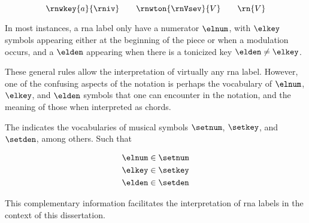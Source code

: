 \begin{equation}
    \label{eq:rn_three_annotations}
    \rnwkey{a}{\rniv} \qquad \rnwton{\rnVsev}{V} \qquad \rn{V}
\end{equation}


In most instances, a \gls{rna} label only have a numerator
$\elnum$, with $\elkey$ symbols appearing either at the
beginning of the piece or when a modulation occurs, and a
$\elden$ appearing when there is a tonicized key $\elden
\neq \elkey$.

These general rules allow the interpretation of virtually
any \gls{rna} label. However, one of the confusing aspects
of the notation is perhaps the vocabulary of $\elnum$,
$\elkey$, and $\elden$ symbols that one can encounter in the
notation, and the meaning of those when interpreted as
chords.

The 
indicates the vocabularies of musical symbols $\setnum$,
$\setkey$, and $\setden$, among others. Such that

\begin{equation}
    \begin{split}
    \elnum \in \setnum \\
    \elkey \in \setkey \\
    \elden \in \setden
    \end{split}
\end{equation}

This complementary information facilitates the
interpretation of \gls{rna} labels in the context of this
dissertation.
